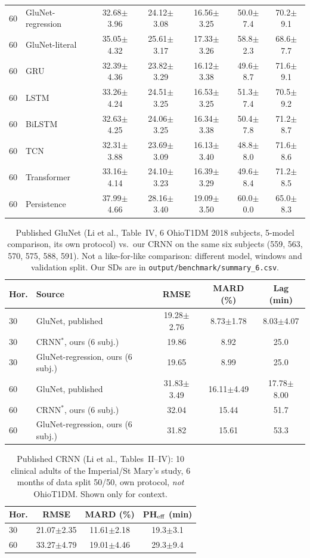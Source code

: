 \documentclass[conference]{IEEEtran}
\begin{document}
\begin{table}[t]
\begin{tabular}{llccccc}
60 & GluNet-regression & 32.68$\pm$3.96 & 24.12$\pm$3.08 & 16.56$\pm$3.25 & 50.0$\pm$7.4 & 70.2$\pm$9.1\\
60 & GluNet-literal & 35.05$\pm$4.32 & 25.61$\pm$3.17 & 17.33$\pm$3.26 & 58.8$\pm$2.3 & 68.6$\pm$7.7\\
60 & GRU & 32.39$\pm$4.36 & 23.82$\pm$3.29 & 16.12$\pm$3.38 & 49.6$\pm$8.7 & 71.6$\pm$9.1\\
60 & LSTM & 33.26$\pm$4.24 & 24.51$\pm$3.25 & 16.53$\pm$3.25 & 51.3$\pm$7.4 & 70.5$\pm$9.2\\
60 & BiLSTM & 32.63$\pm$4.25 & 24.06$\pm$3.25 & 16.34$\pm$3.38 & 50.4$\pm$7.8 & 71.2$\pm$8.7\\
60 & TCN & 32.31$\pm$3.88 & 23.69$\pm$3.09 & 16.13$\pm$3.40 & 48.8$\pm$8.0 & 71.6$\pm$8.6\\
60 & Transformer & 33.16$\pm$4.14 & 24.10$\pm$3.23 & 16.39$\pm$3.29 & 49.6$\pm$8.4 & 71.2$\pm$8.5\\
60 & Persistence & 37.99$\pm$4.66 & 28.16$\pm$3.40 & 19.09$\pm$3.50 & 60.0$\pm$0.0 & 65.0$\pm$8.3\\
\bottomrule
\end{tabular}\end{table}
\begin{table}[t]\centering\caption{Published GluNet (Li et al., Table~IV, 6 OhioT1DM 2018 subjects, 5-model comparison, its own protocol) vs.\ our CRNN on the same six subjects (559, 563, 570, 575, 588, 591). Not a like-for-like comparison: different model, windows and validation split. Our SDs are in \texttt{output/benchmark/summary\_6.csv}.}
\small\begin{tabular}{llccc}\toprule
Hor. & Source & RMSE & MARD (\%) & Lag (min)\\\midrule
30 & GluNet, published & 19.28$\pm$2.76 & 8.73$\pm$1.78 & 8.03$\pm$4.07\\
30 & CRNN$^{*}$, ours (6 subj.) & 19.86 & 8.92 & 25.0\\
30 & GluNet-regression, ours (6 subj.) & 19.65 & 8.99 & 25.0\\
60 & GluNet, published & 31.83$\pm$3.49 & 16.11$\pm$4.49 & 17.78$\pm$8.00\\
60 & CRNN$^{*}$, ours (6 subj.) & 32.04 & 15.44 & 51.7\\
60 & GluNet-regression, ours (6 subj.) & 31.82 & 15.61 & 53.3\\\bottomrule
\end{tabular}\end{table}
\begin{table}[t]\centering\caption{Published CRNN (Li et al., Tables~II--IV): 10 clinical adults of the Imperial/St Mary's study, 6 months of data split 50/50, own protocol, \emph{not} OhioT1DM. Shown only for context.}
\small\begin{tabular}{lccc}\toprule
Hor. & RMSE & MARD (\%) & PH$_{\rm eff}$ (min)\\\midrule
30 & 21.07$\pm$2.35 & 11.61$\pm$2.18 & 19.3$\pm$3.1\\
60 & 33.27$\pm$4.79 & 19.01$\pm$4.46 & 29.3$\pm$9.4\\\bottomrule
\end{tabular}\end{table}
\end{document}
